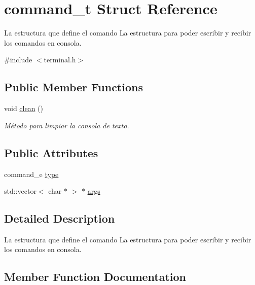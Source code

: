 \hypertarget{structcommand__t}{}\section{command\+\_\+t Struct Reference}
\label{structcommand__t}


La estructura que define el comando La estructura para poder escribir y recibir los comandos en consola.  




{\ttfamily \#include $<$terminal.\+h$>$}

\subsection*{Public Member Functions}
\begin{DoxyCompactItemize}
\item 
void \hyperlink{structcommand__t_a1173d8691d9378e84dff50d5d9e25d8a}{clean} ()
\begin{DoxyCompactList}\small\item\em Método para limpiar la consola de texto. \end{DoxyCompactList}\end{DoxyCompactItemize}
\subsection*{Public Attributes}
\begin{DoxyCompactItemize}
\item 
command\+\_\+e \hyperlink{structcommand__t_a82809ade46f827d02e768160a72ab926}{type}
\item 
std\+::vector$<$ char $\ast$ $>$ $\ast$ \hyperlink{structcommand__t_a1de9d090c1926cf39720267947f11699}{args}
\end{DoxyCompactItemize}


\subsection{Detailed Description}
La estructura que define el comando La estructura para poder escribir y recibir los comandos en consola. 

\subsection{Member Function Documentation}
\mbox{\label{structcommand__t_a1173d8691d9378e84dff50d5d9e25d8a}} 
